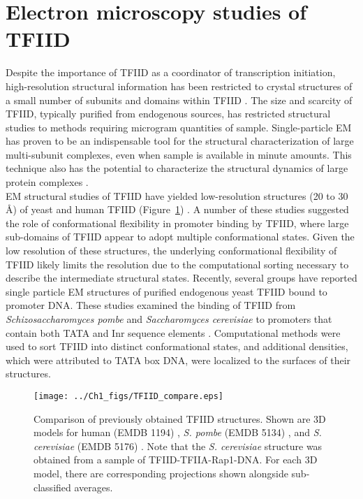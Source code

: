 \section{Electron microscopy studies of TFIID}

Despite the importance of TFIID as a coordinator of transcription initiation, high-resolution structural information has been restricted to crystal structures of a small number of subunits and domains within TFIID \cite{Bhattacharya_1103,Jacobson_2160,Kim_3416,Kim_3377,Liu_2574,Werten_1763,Xie_2805}. The size and scarcity of TFIID, typically purified from endogenous sources, has restricted structural studies to methods requiring microgram quantities of sample. Single-particle EM has proven to be an indispensable tool for the structural characterization of large multi-subunit complexes, even when sample is available in minute amounts. This technique also has the potential to characterize the structural dynamics of large protein complexes \cite{Leschziner_883}.\\
\indent EM structural studies of TFIID have yielded low-resolution structures (20 to 30 \AA) of yeast and human TFIID (Figure~\ref{fig:Compare}) \cite{Andel_2407,Brand_2375,Elmlund_691,Grob_1281,Leurent_1797,Leurent_1554,Liu_574,Papai_418,Papai_539}. A number of these studies suggested the role of conformational flexibility in promoter binding by TFIID, where large sub-domains of TFIID appear to adopt multiple conformational states. Given the low resolution of these structures, the underlying conformational flexibility of TFIID likely limits the resolution due to the computational sorting necessary to describe the intermediate structural states. Recently, several groups have reported single particle EM structures of purified endogenous yeast TFIID bound to promoter DNA. These studies examined the binding of TFIID from \emph{Schizosaccharomyces pombe} and \emph{Saccharomyces cerevisiae} to promoters that contain both TATA and Inr sequence elements \cite{Elmlund_691,Papai_539}. Computational methods were used to sort TFIID into distinct conformational states, and additional densities, which were attributed to TATA box DNA, were localized to the surfaces of their structures.\\
\begin{figure}
\centering
\texttt{[image: ../Ch1\_figs/TFIID\_compare.eps]}
\caption[Comparison of previously obtained TFIID structures]{Comparison of previously obtained TFIID structures. Shown are 3D models for human (EMDB 1194) \cite{Grob_1281}, \emph{S. pombe} (EMDB 5134) \cite{Elmlund_691}, and \emph{S. cerevisiae} (EMDB 5176) \cite{Papai_539}. Note that the  \emph{S. cerevisiae} structure was obtained from a sample of TFIID-TFIIA-Rap1-DNA. For each 3D model, there are corresponding projections shown alongside sub-classified averages.}
\label{fig:Compare}
\end{figure}
